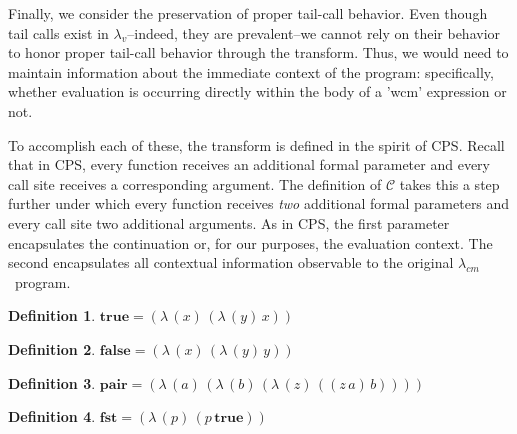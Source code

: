 \documentclass{llncs}
\newcommand{\cm}[0]{$\lambda_{cm}$}
\newcommand{\lv}[0]{$\lambda_v$}
\newcommand{\app}[2]{(#1\,#2)}
\newcommand{\abs}[2]{(\lambda\,(#1)\,#2)}
\begin{document}
Finally, we consider the preservation of proper tail-call behavior. Even though tail calls exist in \lv--indeed, they are prevalent--we cannot rely on their behavior to honor proper tail-call behavior through the transform. Thus, we would need to maintain information about the immediate context of the program: specifically, whether evaluation is occurring directly within the body of a \scheme'wcm' expression or not.

To accomplish each of these, the transform is defined in the spirit of CPS. Recall that in
CPS, every function receives an additional formal parameter and every call site receives a
corresponding argument. The definition of $\mathcal{C}$ takes this a step further under
which every function receives \emph{two} additional formal parameters and every call site
two additional arguments. As in CPS, the first parameter encapsulates the continuation or,
for our purposes, the evaluation context. The second encapsulates all contextual
information observable to the original \cm\ program.

\newtheorem{defn}{Definition}

\newenvironment{schemedefn}[1]{\begin{defn}$#1$}{\end{defn}}
\newenvironment{namedschemedefn}[2]{\begin{defn}\label{#1}$#2$}{\end{defn}}


\newcommand{\true}{\mathbf{true}}
\newcommand{\false}{\mathbf{false}}
\newcommand{\nil}{\mathbf{nil}}
\newcommand{\pair}[2]{((\mathbf{pair}\,#1)\,#2)}
\newcommand{\eval}[1]{\overline{#1}}

\begin{defn}
$\true=\abs{x}{\abs{y}{x}}$
\end{defn}

\begin{defn}
$\false=\abs{x}{\abs{y}{y}}$
\end{defn}

\begin{defn}
$\mathbf{pair}=\abs{a}{\abs{b}{\abs{z}{\app{\app{z}{a}}{b}}}}$
\end{defn}

\begin{defn}
$\mathbf{fst}=\abs{p}{\app{p}{\true}}$
\end{defn}
\end{document}
